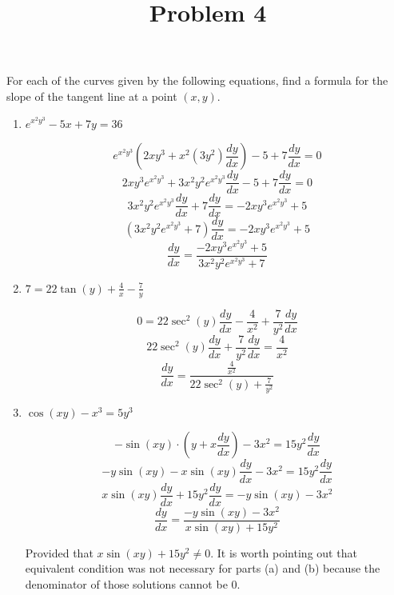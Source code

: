 \documentclass{ximera}
\title[Problem 4]{Problem 4}
\begin{document}
\begin{abstract} \end{abstract}
\maketitle


\begin{problem}
  For each of the curves given by the following equations, find a formula for the slope of the tangent line at a point $(x, y)$.

	\begin{enumerate}
	
	\item  $e^{x^2 y^3} - 5x + 7y = 36$
\begin{explanation}
			$$ e^{x^2 y^3} \left( 2xy^3 + x^2 (3y^2)\dfrac{dy}{dx} \right) - 5 + 7\dfrac{dy}{dx} = 0 $$
			$$ 2xy^3 e^{x^2y^3} + 3x^2y^2e^{x^2y^3}\dfrac{dy}{dx} - 5 + 7\dfrac{dy}{dx} = 0 $$
			$$ 3x^2y^2e^{x^2y^3}\dfrac{dy}{dx} + 7\dfrac{dy}{dx} = -2xy^3 e^{x^2y^3} + 5 $$
			$$ \left( 3x^2y^2e^{x^2y^3} + 7 \right) \dfrac{dy}{dx} = -2xy^3 e^{x^2y^3} + 5 $$
			$$  \dfrac{dy}{dx} = \frac{-2xy^3 e^{x^2y^3} + 5}{3x^2 y^2 e^{x^2y^3} + 7} $$
			\end{explanation}
			
			
			
	\item  $7 = 22 \tan(y) + \frac{4}{x} - \frac{7}{y}$
\begin{explanation}
			$$ 0 = 22 \sec^2 (y) \dfrac{dy}{dx} - \frac{4}{x^2} + \frac{7}{y^2} \dfrac{dy}{dx} $$
			$$ 22 \sec^2(y) \dfrac{dy}{dx} + \frac{7}{y^2} \dfrac{dy}{dx} = \frac{4}{x^2} $$
			$$ \dfrac{dy}{dx} = \frac{\frac{4}{x^2}}{22 \sec^2(y) + \frac{7}{y^2}} $$
			\end{explanation}
			
			
			
	\item  $\cos(xy) - x^3 = 5y^3$
\begin{explanation}
			$$ -\sin(xy) \cdot \left(y + x \dfrac{dy}{dx} \right) - 3x^2 = 15y^2 \dfrac{dy}{dx} $$
			$$ -y \sin(xy) - x \sin(xy) \dfrac{dy}{dx} - 3x^2 = 15y^2 \dfrac{dy}{dx} $$
			$$ x \sin(xy) \dfrac{dy}{dx} + 15y^2 \dfrac{dy}{dx} = -y \sin(xy) - 3x^2 $$
			$$ \dfrac{dy}{dx} = \frac{-y \sin(xy) - 3x^2}{x \sin(xy) + 15y^2} $$
			
			Provided that $x \sin(xy) + 15y^2 \neq 0$.  It is worth pointing out that equivalent condition was not necessary for parts (a) and (b) because the denominator of those solutions cannot be $0$.  
			\end{explanation}
			
			
			
	\end{enumerate}
			
			
			
		
\end{problem}
\end{document}
